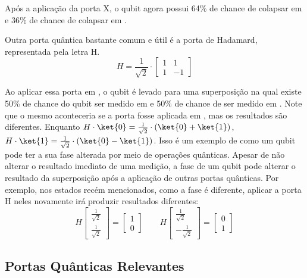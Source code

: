 Após a aplicação da porta X, o qubit agora possui 64\% de chance de colapsar em  e 36\% de chance de colapsar em .

Outra porta quântica bastante comum e útil é a porta de Hadamard, representada pela letra H.
\begin{equation}
  H
  =
  \frac{1}{\sqrt{2}}
  \cdot
  \begin{bmatrix}
    1 & 1 \\
    1 & -1
  \end{bmatrix}
\end{equation}

Ao aplicar essa porta em , o qubit é levado para uma superposição na qual existe 50\% de chance do qubit ser medido em  e 50\% de chance de ser medido em . Note que o mesmo aconteceria se a porta fosse aplicada em , mas os resultados são diferentes. Enquanto $H \cdot\ket{0} = \frac{1}{\sqrt{2}}\cdot(\ket{0} + \ket{1})$, $H \cdot \ket{1} = \frac{1}{\sqrt{2}} \cdot (\ket{0} - \ket{1})$. Isso é um exemplo de como um qubit pode ter a sua fase alterada por meio de operações quânticas. Apesar de não alterar o resultado imediato de uma medição, a fase de um qubit pode alterar o resultado da superposição após a aplicação de outras portas quânticas. Por exemplo, nos estados recém mencionados, como a fase é diferente, aplicar a porta H neles novamente irá produzir resultados diferentes:
\begin{equation}
  H \begin{bmatrix}
    \frac{1}{\sqrt{2}} \\
    \frac{1}{\sqrt{2}}
  \end{bmatrix}
  =
  \begin{bmatrix}
    1 \\
    0
  \end{bmatrix}
  \qquad
  H \begin{bmatrix}
    \frac{1}{\sqrt{2}} \\
    -\frac{1}{\sqrt{2}}
  \end{bmatrix}
  =
  \begin{bmatrix}
    0 \\
    1
  \end{bmatrix}
\end{equation}

\subsection{Portas Quânticas Relevantes}\label{sub:relevant_gates}

